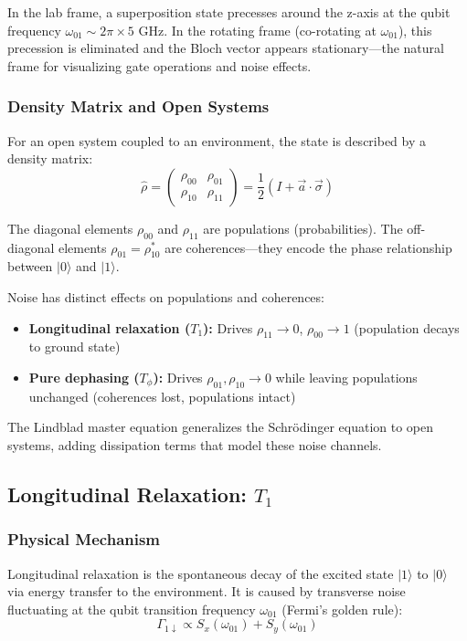 \documentclass{article}
\begin{document}
In the lab frame, a superposition state precesses around the z-axis at the qubit frequency $\omega_{01} \sim 2\pi \times 5$ GHz. In the rotating frame (co-rotating at $\omega_{01}$), this precession is eliminated and the Bloch vector appears stationary—the natural frame for visualizing gate operations and noise effects.

\subsubsection*{Density Matrix and Open Systems}

For an open system coupled to an environment, the state is described by a density matrix:
$$\hat{\rho} = \begin{pmatrix} \rho_{00} & \rho_{01} \\ \rho_{10} & \rho_{11} \end{pmatrix} = \frac{1}{2}(I + \vec{a} \cdot \vec{\sigma})$$

The diagonal elements $\rho_{00}$ and $\rho_{11}$ are populations (probabilities). The off-diagonal elements $\rho_{01} = \rho_{10}^*$ are coherences—they encode the phase relationship between $|0\rangle$ and $|1\rangle$.

Noise has distinct effects on populations and coherences:
\begin{itemize}
    \item \textbf{Longitudinal relaxation ($T_1$):} Drives $\rho_{11} \to 0$, $\rho_{00} \to 1$ (population decays to ground state)
    \item \textbf{Pure dephasing ($T_\phi$):} Drives $\rho_{01}, \rho_{10} \to 0$ while leaving populations unchanged (coherences lost, populations intact)
\end{itemize}

The Lindblad master equation generalizes the Schrödinger equation to open systems, adding dissipation terms that model these noise channels.

\subsection{Longitudinal Relaxation: $T_1$}

\subsubsection*{Physical Mechanism}

Longitudinal relaxation is the spontaneous decay of the excited state $|1\rangle$ to $|0\rangle$ via energy transfer to the environment. It is caused by transverse noise fluctuating at the qubit transition frequency $\omega_{01}$ (Fermi's golden rule):
$$\Gamma_{1\downarrow} \propto S_x(\omega_{01}) + S_y(\omega_{01})$$
\end{document}
